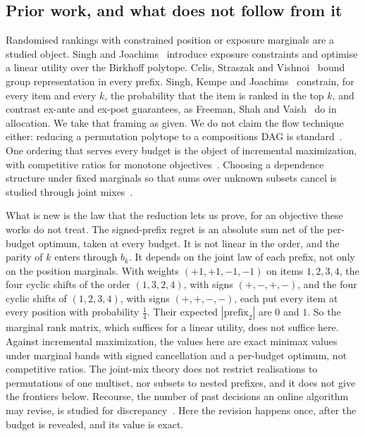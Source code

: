 \subsection{Prior work, and what does not follow from it}

Randomised rankings with constrained position or exposure marginals are a studied object.
Singh and Joachims~\cite{singh2018} introduce exposure constraints and optimise a linear
utility over the Birkhoff polytope. Celis, Straszak and Vishnoi~\cite{celis2018} bound group
representation in every prefix. Singh, Kempe and Joachims~\cite{singh2021} constrain, for every
item and every $k$, the probability that the item is ranked in the top $k$, and contrast ex-ante
and ex-post guarantees, as Freeman, Shah and Vaish~\cite{freeman2020} do in allocation. We
take that framing as given. We do not claim the flow technique either: reducing a permutation
polytope to a compositions DAG is standard~\cite{schrijver2003}. One ordering that serves every
budget is the object of incremental maximization, with competitive ratios for monotone
objectives~\cite{disser2023,bienkowski2026}. Choosing a dependence structure under fixed
marginals so that sums over unknown subsets cancel is studied through joint
mixes~\cite{koike2022}.

What is new is the law that the reduction lets us prove, for an objective these works do not
treat. The signed-prefix regret is an absolute sum net of the per-budget optimum, taken at
every budget. It is not linear in the order, and the parity of $k$ enters through $b_{k}$. It
depends on the joint law of each prefix, not only on the position marginals. With weights
$(+1,+1,-1,-1)$ on items $1,2,3,4$, the four cyclic shifts of the order $(1,3,2,4)$, with signs
$(+,-,+,-)$, and the four cyclic shifts of $(1,2,3,4)$, with signs $(+,+,-,-)$, each put every item
at every position with probability $\frac14$. Their expected $|\text{prefix}_{2}|$ are $0$ and
$1$. So the marginal rank matrix, which suffices for a linear utility, does not
suffice here. Against incremental maximization, the values here are exact minimax values under
marginal bands with signed cancellation and a per-budget optimum, not competitive ratios. The
joint-mix theory does not restrict realisations to permutations of one multiset, nor subsets to
nested prefixes, and it does not give the frontiers below. Recourse, the number of past
decisions an online algorithm may revise, is studied for discrepancy~\cite{gupta2022}. Here the
revision happens once, after the budget is revealed, and its value is exact.

